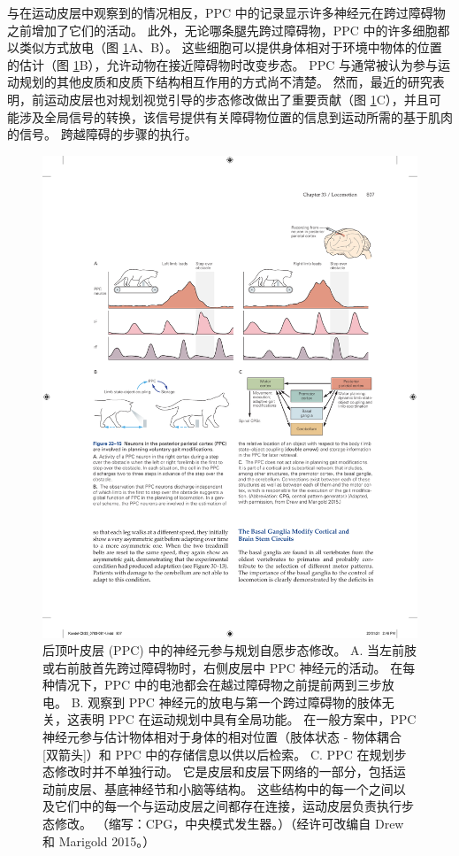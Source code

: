 与在运动皮层中观察到的情况相反，PPC 中的记录显示许多神经元在跨过障碍物之前增加了它们的活动。 
此外，无论哪条腿先跨过障碍物，PPC 中的许多细胞都以类似方式放电（图 \ref{fig:33_15}A、B）。 
这些细胞可以提供身体相对于环境中物体的位置的估计（图 \ref{fig:33_15}B），允许动物在接近障碍物时改变步态。 PPC 与通常被认为参与运动规划的其他皮质和皮质下结构相互作用的方式尚不清楚。 然而，最近的研究表明，前运动皮层也对规划视觉引导的步态修改做出了重要贡献（图 \ref{fig:33_15}C），并且可能涉及全局信号的转换，该信号提供有关障碍物位置的信息到运动所需的基于肌肉的信号。 跨越障碍的步骤的执行。

\begin{figure}[htbp]
	\centering
	\includegraphics[width=0.95\linewidth]{chap33/fig_33_15}
	\caption{后顶叶皮层 (PPC) 中的神经元参与规划自愿步态修改。 A. 当左前肢或右前肢首先跨过障碍物时，右侧皮层中 PPC 神经元的活动。 在每种情况下，PPC 中的电池都会在越过障碍物之前提前两到三步放电。 B. 观察到 PPC 神经元的放电与第一个跨过障碍物的肢体无关，这表明 PPC 在运动规划中具有全局功能。 在一般方案中，PPC 神经元参与估计物体相对于身体的相对位置（肢体状态 - 物体耦合 [双箭头]）和 PPC 中的存储信息以供以后检索。 C. PPC 在规划步态修改时并不单独行动。 它是皮层和皮层下网络的一部分，包括运动前皮层、基底神经节和小脑等结构。 这些结构中的每一个之间以及它们中的每一个与运动皮层之间都存在连接，运动皮层负责执行步态修改。 （缩写：CPG，中央模式发生器。）（经许可改编自 Drew 和 Marigold 2015。）}
	\label{fig:33_15}
\end{figure}

